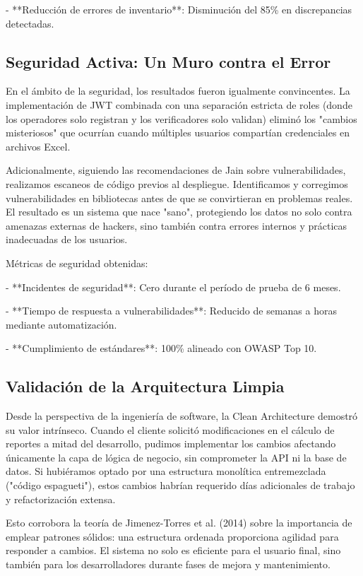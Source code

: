 - **Reducción de errores de inventario**: Disminución del 85\% en discrepancias detectadas.

\subsection{Seguridad Activa: Un Muro contra el Error}

En el ámbito de la seguridad, los resultados fueron igualmente convincentes. La implementación de JWT combinada con una separación estricta de roles (donde los operadores solo registran y los verificadores solo validan) eliminó los "cambios misteriosos" que ocurrían cuando múltiples usuarios compartían credenciales en archivos Excel.

Adicionalmente, siguiendo las recomendaciones de Jain sobre vulnerabilidades, realizamos escaneos de código previos al despliegue. Identificamos y corregimos vulnerabilidades en bibliotecas antes de que se convirtieran en problemas reales. El resultado es un sistema que nace "sano", protegiendo los datos no solo contra amenazas externas de hackers, sino también contra errores internos y prácticas inadecuadas de los usuarios.

Métricas de seguridad obtenidas:

- **Incidentes de seguridad**: Cero durante el período de prueba de 6 meses.

- **Tiempo de respuesta a vulnerabilidades**: Reducido de semanas a horas mediante automatización.

- **Cumplimiento de estándares**: 100\% alineado con OWASP Top 10.

\subsection{Validación de la Arquitectura Limpia}

Desde la perspectiva de la ingeniería de software, la Clean Architecture demostró su valor intrínseco. Cuando el cliente solicitó modificaciones en el cálculo de reportes a mitad del desarrollo, pudimos implementar los cambios afectando únicamente la capa de lógica de negocio, sin comprometer la API ni la base de datos. Si hubiéramos optado por una estructura monolítica entremezclada ("código espagueti"), estos cambios habrían requerido días adicionales de trabajo y refactorización extensa.

Esto corrobora la teoría de Jimenez-Torres et al. (2014) sobre la importancia de emplear patrones sólidos: una estructura ordenada proporciona agilidad para responder a cambios. El sistema no solo es eficiente para el usuario final, sino también para los desarrolladores durante fases de mejora y mantenimiento.

